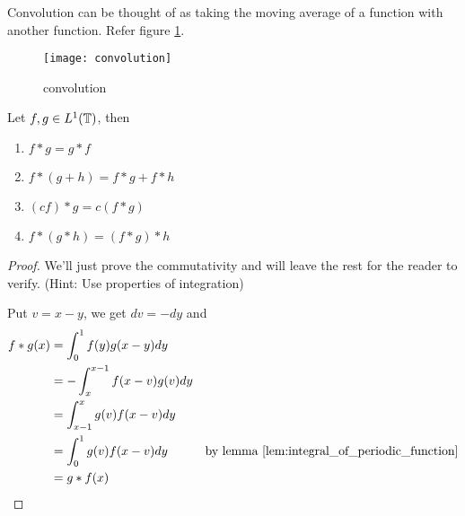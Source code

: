   Convolution can be thought of as taking the moving average of a function with another function. Refer figure \ref{fig:convolution}.
  \begin{figure}
    \centering
    \texttt{[image: convolution]}
    \caption{convolution}
    \label{fig:convolution}
  \end{figure}

  \begin{proposition}
    \label{prop:properties_of_convolution}
    Let $f, g \in L^1(\mathbb T)$, then 
    \begin{enumerate}[label=(\alph*)]
      \item $f*g = g*f$
      \item $f*(g+h) = f*g +f*h$
      \item $(cf)*g = c(f*g)$
      \item $f*(g*h) = (f*g)*h$
    \end{enumerate}
  \end{proposition}
  \begin{proof}
    We'll just prove the commutativity and will leave the rest for the reader to verify. (Hint: Use properties of integration)

    Put $v = x-y$, we get $dv = -dy$ and 
    \begin{align*}
      f*g(x)  &= \int_{0}^{1}f(y)g(x-y) dy \\
              &= -\int_{x}^{x-1} f(x - v)g(v) dy\\
              &= \int_{x-1}^{x} g(v)f(x-v) dy \\
              &= \int_{0}^{1}g(v)f(x-v)dy  &\text{by lemma } \ref{lem:integral_of_periodic_function}\\
              &=g*f(x)
    \end{align*} 
  \end{proof}
  

